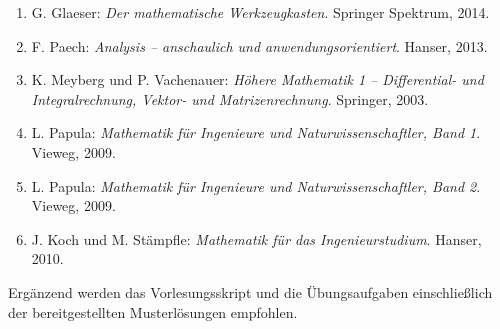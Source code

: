 
\begin{enumerate}[itemsep=0.2em,topsep=0.3em]
  \item G. Glaeser: \emph{Der mathematische Werkzeugkasten}.
    Springer Spektrum, 2014.
  \item F. Paech: \emph{Analysis -- anschaulich und anwendungsorientiert}.
    Hanser, 2013.
  \item K. Meyberg und P. Vachenauer: \emph{Höhere Mathematik 1 --
    Differential- und Integralrechnung, Vektor- und Matrizenrechnung}.
    Springer, 2003.
  \item L. Papula: \emph{Mathematik für Ingenieure und Naturwissenschaftler,
    Band 1}. Vieweg, 2009.
  \item L. Papula: \emph{Mathematik für Ingenieure und Naturwissenschaftler,
    Band 2}. Vieweg, 2009.
  \item J. Koch und M. Stämpfle: \emph{Mathematik für das Ingenieurstudium}.
    Hanser, 2010.
\end{enumerate}

Ergänzend werden das Vorlesungsskript und die Übungsaufgaben einschließlich
der bereitgestellten Musterlösungen empfohlen.

